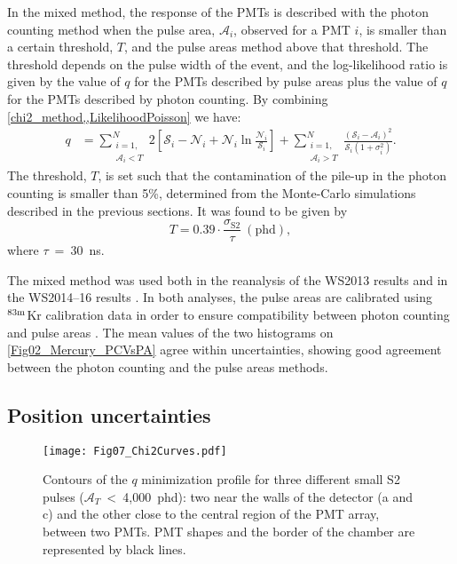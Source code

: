 \documentclass[a4paper,11pt]{article}
\begin{document}
In the mixed method, the response of the PMTs is described with the photon counting method when the pulse area, ${\mathcal A_i}$, observed for a PMT $i$, is smaller than a certain threshold, $T$, and the pulse areas method above that threshold. The threshold depends on the pulse width of the event, and the log-likelihood ratio is given by the value of $q$ for the PMTs described by pulse areas plus the value of $q$ for the PMTs described by photon counting. By combining \cref{chi2_method,,LikelihoodPoisson} we have:
\begin{align} 
q & =  \sum_{\substack{i=1,\\ \mathcal{A}_i<T}}^{N} 2 \left[{\mathcal S}_i-\mathcal{N}_i + \mathcal{N}_i \ln\frac{\mathcal{N}_i}{\mathcal{S}_i}\right]
 + \sum_{\substack{i=1,\\\mathcal{A}_i>T}}^{N}\frac{\left({\mathcal S}_i-\mathcal{A}_i\right)^2}{\mathcal{S}_i\left(1+\sigma_i^2\right)}.
\label{eq_loglikelihood}
\end{align} 
The threshold, $T$, is set such that the contamination of the pile-up in the photon counting is smaller than 5\%, determined from the Monte-Carlo simulations described in the previous sections. It was found to be given by
\begin{equation}
T = 0.39\cdot \frac{\sigma_{\mathrm S2}}{\tau}~{\mathrm{(phd)}},
\end{equation}
where $\tau$~=~30~ns.

The mixed method was used both in the reanalysis of the WS2013 results \cite{LUX2015_ReanalysisPRL} and in the WS2014--16 results \cite{LUX2016_SSR}. In both analyses, the pulse areas are calibrated using ${}^{\rm 83m}$Kr calibration data in order to ensure compatibility between photon counting and pulse areas \cite{LUX2015_ReanalysisPRD}. The mean values of the two histograms on \cref{Fig02_Mercury_PCVsPA}  agree within  uncertainties, showing good agreement between the photon counting and the pulse areas methods.


\subsection{Position uncertainties\label{section_Likelihood_Ratio_Analysis}}

\begin{figure*}
 \begin{center}
     \texttt{[image: Fig07\_Chi2Curves.pdf]}	
\caption{Contours of the $q$ minimization profile for three different small S2 pulses (${\mathcal A}_T$~<~4,000~phd): two near the walls of the detector (a and c) and the other close to the central region of the PMT array, between two PMTs. PMT shapes and the border of the chamber are represented  by black lines.}
  \label{Fig11_Chi2Curves}
 \end{center}%
\end{figure*}
\end{document}

